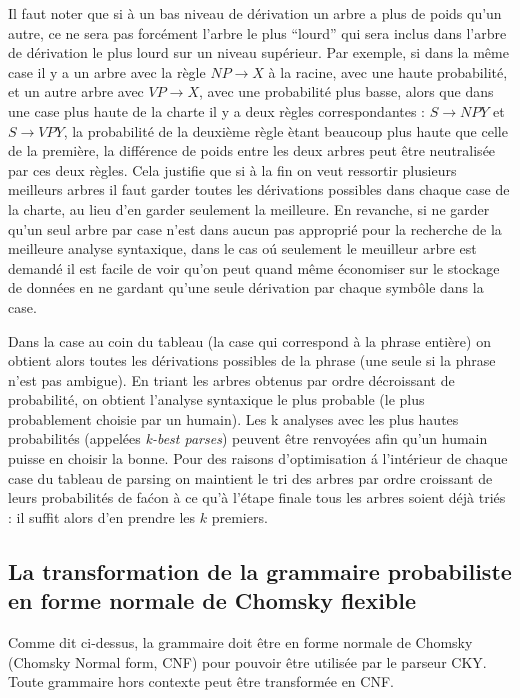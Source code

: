 \documentclass[12pt]{article}
\begin{document}
Il faut noter que si \`a un bas niveau de
d\'erivation un arbre a plus de poids qu'un autre, ce ne sera pas forc\'ement
l'arbre le plus ``lourd''  qui sera inclus dans l'arbre de d\'erivation le plus
lourd sur un niveau sup\'erieur. Par exemple, si dans la m\^eme case il y a un arbre
avec la r\`egle $NP \rightarrow X$ \`a la racine, avec une haute probabilit\'e, et un
autre arbre avec $VP \rightarrow X$, avec une probabilit\'e plus basse, alors que
dans une case plus haute de la charte il y a deux r\`egles correspondantes : $S
\rightarrow NP Y$ et $S \rightarrow VP Y$, la probabilit\'e de la deuxi\`eme r\`egle
\`etant beaucoup plus haute que celle de la premi\`ere, la diff\'erence de poids entre
les deux arbres peut \^etre neutralis\'ee par ces deux r\`egles. Cela justifie
que si \`a la fin on veut ressortir plusieurs meilleurs arbres il
faut garder toutes les d\'erivations possibles dans chaque case de la charte, au
lieu d'en garder seulement la meilleure. En revanche, si ne garder qu'un seul arbre par case n'est
 dans aucun pas appropri\'e pour la recherche de la meilleure analyse syntaxique,
 dans le cas o\'u seulement le meuilleur arbre est demand\'e
 il est facile de voir qu'on peut quand m\^eme \'economiser sur le stockage de donn\'ees
 en ne gardant qu'une seule d\'erivation par chaque symb\^ole dans la case. \par

Dans la case au coin du tableau (la case qui correspond \`a la phrase enti\`ere) on
obtient alors toutes les d\'erivations possibles de la phrase (une seule si la
phrase n'est pas ambigue). En triant les arbres obtenus par ordre d\'ecroissant de
probabilit\'e, on obtient l'analyse syntaxique le plus probable (le plus
probablement choisie par un humain). Les k analyses avec les plus hautes
probabilit\'es (appel\'ees \textit{k-best parses}) peuvent \^etre renvoy\'ees afin qu'un humain
puisse en choisir la bonne. Pour des raisons d'optimisation \'a l'int\'erieur de chaque case
du tableau de parsing on maintient le tri des arbres par ordre croissant de leurs probabilit\'es
de fa\'con \`a ce qu'\`a l'\'etape finale tous les arbres soient d\'ej\`a tri\'es : il suffit alors d'en prendre
les $k$ premiers.


\subsection{La transformation de la grammaire probabiliste en forme normale de Chomsky flexible}

Comme dit ci-dessus, la grammaire doit \^etre en forme normale de Chomsky
(Chomsky Normal form, CNF) pour pouvoir \^etre utilis\'ee par le parseur CKY. Toute
grammaire hors contexte peut \^etre transform\'ee en CNF. \par
\end{document}
